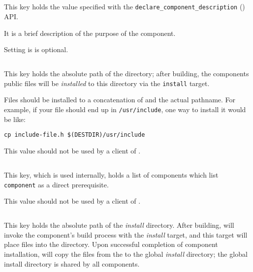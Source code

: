 \subsection{}

This key holds the value specified with the
\texttt{declare\_component\_description}
() API.

It is a brief description of the purpose of the component.

Setting is is optional.

\subsection{}

This key holds the absolute path of the \destdir directory; after
building, the components public files will be \emph{installed} to this
directory via the \texttt{install} target.

Files should be installed to a concatenation of \destdir and the actual
pathname.  For example, if your file should end up in
\texttt{/usr/include}, one way to install it would be like:

\begin{verbatim}
cp include-file.h $(DESTDIR)/usr/include
\end{verbatim}

This value should not be used by a client of \lmsbw.

\subsection{}

This key, which is used internally, holds a list of components which
list \texttt{component} as a direct prerequisite.

This value should not be used by a client of \lmsbw.

\subsection{}

This key holds the absolute path of the \emph{install} directory.
After building, \lmsbw will invoke the component's build process with
the \emph{install} target, and this target will place files into the
\destdir directory.  Upon successful completion of component
installation, \lmsbw will copy the files from the \destdir to the
global \emph{install} directory; the global install directory is
shared by all components.

